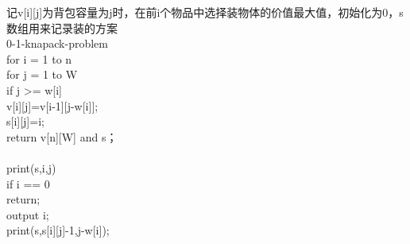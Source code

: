 \documentclass[a4paper, justified]{tufte-handout}
\begin{document}
\begin{solution}
记v[i][j]为背包容量为j时，在前i个物品中选择装物体的价值最大值，初始化为0，s数组用来记录装的方案\\
0-1-knapack-problem\\
\hspace*{0.6 cm} for i = 1 to n\\
\hspace*{1.2 cm}   for j = 1 to W\\
\hspace*{1.8 cm}      if j >= w[i]\\
\hspace*{2.4 cm}         v[i][j]=v[i-1][j-w[i]];\\
\hspace*{2.4 cm}         s[i][j]=i;\\
\hspace*{0.6 cm} return v[n][W] and s；\\
\\
print(s,i,j)\\
\hspace*{0.6 cm} if i == 0   \\
\hspace*{1.2 cm}   return;\\
\hspace*{0.6 cm} output i;\\
\hspace*{0.6 cm} print(s,s[i][j]-1,j-w[i]);\\
\end{solution}

\begin{problem}[TC 16.3-2]

\end{problem}

\begin{solution}
\end{solution}

\begin{problem}[TC 16.3-5]
\end{problem}

\begin{solution}
\end{solution}

\begin{problem}[TC 16.3-8]
\end{problem}

\begin{solution}
\end{solution}
\end{document}
